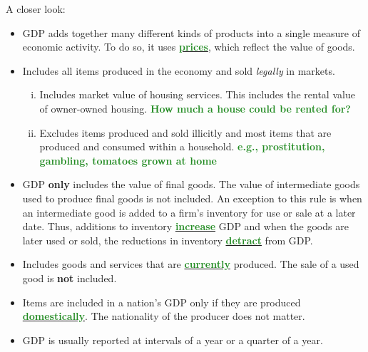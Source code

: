 \documentclass[11pt]{article}\usepackage[]{graphicx}\usepackage[]{color}
\theoremstyle{definition}
\newcommand{\ddp}[1]{{\textbf{\textcolor{ForestGreen}{#1}}}}
\newcommand{\dd}[1]{{\underline{\textbf{\textcolor{ForestGreen}{#1}}}}}
\begin{document}
A closer look:
\begin{itemize}
	\item GDP adds together many different kinds of products into a single measure of economic activity. To do so, it uses \dd{prices}, which reflect the value of goods.
	\item Includes all items produced in the economy and sold \textit{legally} in markets.
	\begin{enumerate}[i.]
		\item Includes market value of housing services. This includes the rental value of owner-owned housing. \ddp{How much a house could be rented for?}
		\item Excludes items produced and sold illicitly and most items that are produced and consumed within a household. \ddp{e.g., prostitution, gambling, tomatoes grown at home}
	\end{enumerate}
	\item GDP \textbf{only} includes the value of final goods. The value of intermediate goods used to produce final goods is not included. An exception to this rule is when an intermediate good is added to a firm's inventory for use or sale at a later date. Thus, additions to inventory \dd{increase} GDP and when the goods are later used or sold, the reductions in inventory \dd{detract} from GDP.
	\item Includes goods and services that are \dd{currently} produced. The sale of a used good is \textbf{not} included. 
	\item Items are included in a nation's GDP only if they are produced \dd{domestically}. The nationality of the producer does not matter.
	\item GDP is usually reported at intervals of a year or a quarter of a year.
\end{itemize}
\end{document}
